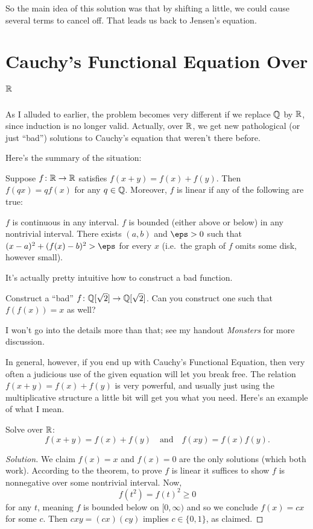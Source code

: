\documentclass[11pt]{scrartcl}
\begin{document}
So the main idea of this solution was that by shifting a little,
we could cause several terms to cancel off.
That leads us back to Jensen's equation.

\section{Cauchy's Functional Equation Over $\mathbb R$}
As I alluded to earlier, the problem becomes very
different if we replace $\mathbb Q$ by $\mathbb R$, since
induction is no longer valid.
Actually, over $\mathbb R$, we get new pathological (or just ``bad'')
solutions to Cauchy's equation that weren't there before.

Here's the summary of the situation:
\begin{theorem}
  Suppose $f \colon \mathbb R \to \mathbb R$ satisfies $f(x+y) = f(x) + f(y)$.
  Then $f(qx) = qf(x)$ for any $q \in \mathbb Q$.
  Moreover, $f$ is linear if any of the following are true:
  \begin{itemize}
    \ii $f$ is continuous in any interval.
    \ii $f$ is bounded (either above or below) in any nontrivial interval.
    \ii There exists $(a,b)$ and $\eps > 0$ such that $(x-a)^2 + (f(x)-b)^2 > \eps$ for every $x$
    (i.e.\ the graph of $f$ omits some disk, however small).
  \end{itemize}
\end{theorem}
It's actually pretty intuitive how to construct a bad function.
\begin{exercise}
  Construct a ``bad'' $f \colon \mathbb Q[\sqrt2] \to \mathbb Q[\sqrt2]$.
  Can you construct one such that $f(f(x)) = x$ as well?
\end{exercise}
I won't go into the details more than that; see my handout \emph{Monsters} for more discussion.

In general, however, if you end up with Cauchy's Functional Equation,
then very often a judicious use of the given equation will let you break free.
The relation $f(x+y) = f(x) + f(y)$ is very powerful,
and usually just using the multiplicative structure a little bit will get you what you need.
Here's an example of what I mean.

\begin{example}
  Solve over $\mathbb R$:
  \[ f(x+y) = f(x) + f(y) \quad\text{and}\quad f(xy) = f(x)f(y). \]
\end{example}
\begin{proof}
  [Solution]
  We claim $f(x) = x$ and $f(x) = 0$ are the only solutions (which both work).
  According to the theorem, to prove $f$ is linear it suffices to show $f$ is nonnegative
  over some nontrivial interval.
  Now, \[ f(t^2) = f(t)^2 \ge 0 \] for any $t$,
  meaning $f$ is bounded below on $[0,\infty)$
  and so we conclude $f(x) = cx$ for some $c$.
  Then $cxy = (cx)(cy)$ implies $c \in \{0,1\}$, as claimed.
\end{proof}
\end{document}
